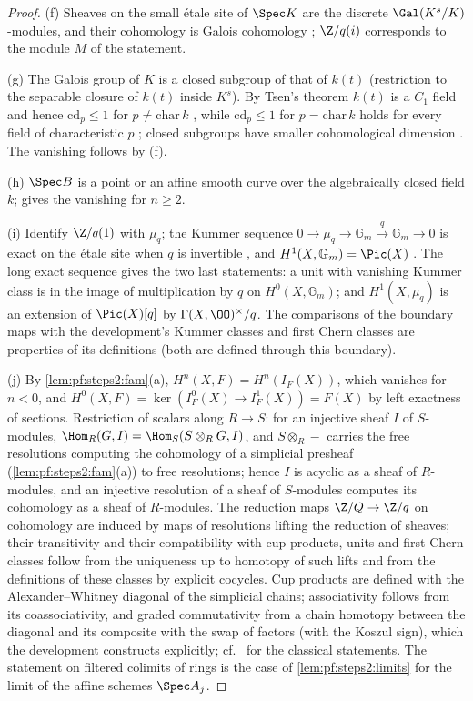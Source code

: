 \begin{proof}
(f) Sheaves on the small \'etale site of $\Spec K$ are the discrete $\Gal(K^s/K)$-modules, and their
cohomology is Galois cohomology \cite[Exp.~VIII, 2.1--2.3]{ArtinGrothendieckVerdier1972}; $\Z/q(i)$
corresponds to the module $M$ of the statement.

(g) The Galois group of $K$ is a closed subgroup of that of $k(t)$ (restriction to the separable
closure of $k(t)$ inside $K^s$). By Tsen's theorem $k(t)$ is a $C_1$ field and hence
$\mathrm{cd}_p\le1$ for $p\ne\mathrm{char}\,k$ \cite[II.3.2, II.3.3]{Serre1997}, while
$\mathrm{cd}_p\le1$ for $p=\mathrm{char}\,k$ holds for every field of characteristic $p$
\cite[II.2.2]{Serre1997}; closed subgroups have smaller cohomological dimension
\cite[I.3.3]{Serre1997}. The vanishing follows by (f).

(h) $\Spec B$ is a point or an affine smooth curve over the algebraically closed field $k$;
\cite[Exp.~IX, 5.7]{ArtinGrothendieckVerdier1972} gives the vanishing for $n\ge2$.

(i) Identify $\Z/q(1)$ with $\mu_q$; the Kummer sequence $0\to\mu_q\to\mathbb G_m\xrightarrow{q}
\mathbb G_m\to0$ is exact on the \'etale site when $q$ is invertible
\cite[Ch.~II, 2.18(b)]{Milne1980}, and $H^1(X,\mathbb G_m)=\Pic(X)$ \cite[Ch.~III, 4.9]{Milne1980}. The
long exact sequence gives the two last statements: a unit with vanishing Kummer class is in the image
of multiplication by $q$ on $H^0(X,\mathbb G_m)$; and $H^1(X,\mu_q)$ is an extension of $\Pic(X)[q]$ by
$\Gamma(X,\OO)^\times/q$. The comparisons of the boundary maps with the development's Kummer classes and
first Chern classes are properties of its definitions (both are defined through this boundary).

(j) By \cref{lem:pf:steps2:fam}(a), $H^n(X,F)=H^n(I_F(X))$, which vanishes for $n<0$, and $H^0(X,F)=
\ker(I_F^0(X)\to I_F^1(X))=F(X)$ by left exactness of sections. Restriction of scalars along
$R\to S$: for an injective sheaf $I$ of $S$-modules, $\Hom_R(G,I)=\Hom_S(S\otimes_RG,I)$, and
$S\otimes_R-$ carries the free resolutions computing the cohomology of a simplicial presheaf
(\cref{lem:pf:steps2:fam}(a)) to free resolutions; hence $I$ is acyclic as a sheaf of $R$-modules, and
an injective resolution of a sheaf of $S$-modules computes its cohomology as a sheaf of $R$-modules.
The reduction maps $\Z/Q\to\Z/q$ on cohomology are induced by maps of resolutions lifting the
reduction of sheaves; their transitivity and their compatibility with cup products, units and first
Chern classes follow from the uniqueness up to homotopy of such lifts and from the definitions of
these classes by explicit cocycles. Cup products are defined with the Alexander--Whitney diagonal of
the simplicial chains; associativity follows from its coassociativity, and graded commutativity from a
chain homotopy between the diagonal and its composite with the swap of factors (with the Koszul sign),
which the development constructs explicitly; cf.\ \cite[Ch.~V, \S1]{Milne1980} for the classical
statements. The statement on filtered colimits of rings is the case of \cref{lem:pf:steps2:limits}
for the limit of the affine schemes $\Spec A_j$.


\end{proof}

